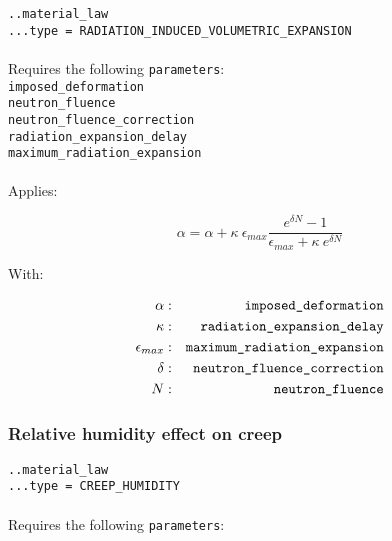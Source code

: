 \documentclass[10pt]{article}
\begin{document}
\noindent \verb+..material_law+\\
\verb+...type = RADIATION_INDUCED_VOLUMETRIC_EXPANSION+

\paragraph{}Requires the following \verb+parameters+:\\

\noindent \verb+imposed_deformation+\\
\verb+neutron_fluence+\\
\verb+neutron_fluence_correction+\\
\verb+radiation_expansion_delay+\\
\verb+maximum_radiation_expansion+\\

\paragraph{}Applies:

\begin{equation}
	\alpha = \alpha + \kappa\ \epsilon_{max} \frac{e^{\delta N}-1}{\epsilon_{max}+\kappa\ e^{\delta N}}
\end{equation}

With:

\begin{eqnarray}
	\alpha & : & \verb+imposed_deformation+ \notag \\
	\kappa & : & \verb+radiation_expansion_delay+\notag  \\
	\epsilon_{max} & : & \verb+maximum_radiation_expansion+ \notag \\
	\delta & : & \verb+neutron_fluence_correction+ \notag \\
	N & : & \verb+neutron_fluence+ \notag 
\end{eqnarray}

\subsubsection{Relative humidity effect on creep}

\noindent \verb+..material_law+\\
\verb+...type = CREEP_HUMIDITY+

\paragraph{}Requires the following \verb+parameters+:\\
\end{document}
